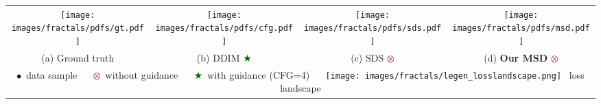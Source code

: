 \newcommand{\datasample}{\textcolor{black}{$\bullet$}}
\newcommand{\withguidance}{\textcolor{darkgreen}{$\bigstar$}}
\newcommand{\noguidance}{\textcolor{darkred}{$\otimes$}}
\newcommand{\guidancelimitedinterval}{\textcolor{cyan}{$\blacklozenge$}}

\newcommand{\classone}{\textcolor{orange}{orange}}
\newcommand{\classtwo}{\textcolor{gray}{gray}}

\begin{figure*}[t]
    \centering
    \setlength{\tabcolsep}{1.5mm}
    \begin{tabular}{c c c c}
        \texttt{[image: images/fractals/pdfs/gt.pdf]}
        & 
        \texttt{[image: images/fractals/pdfs/cfg.pdf]}
        &
        \texttt{[image: images/fractals/pdfs/sds.pdf]}
        &
        \texttt{[image: images/fractals/pdfs/msd.pdf]}
        \\ 
        (a) Ground truth & (b) DDIM \withguidance & (c) SDS \noguidance & (d) \textbf{Our MSD} \noguidance
        \\[3mm]
        \multicolumn{4}{c}{\datasample {\small \, data sample} $\quad$ \noguidance {\small \, without guidance} $\quad$ \withguidance {\small \, with guidance (CFG=4)} $\quad$ \texttt{[image: images/fractals/legen\_losslandscape.png]} {\small \, loss landscape}}
    \end{tabular}
    \vspace{-2mm}
    \caption{
        Mode-seeking simulated in a fractal-like 2D distribution with two (\classone, \classtwo) classes, adapted from \citet{karras2024guiding}. We compare the behavior of diffusion sampling (DDIM) to optimization-based diffusion distillation, in a class-conditional setting. With class=\classone, \textbf{(a)} Ground truth distribution, \textbf{(b)} DDIM sampling, \textbf{(c)} SDS optimization without guidance, and \textbf{(d)} our MSD optimization without guidance.
    }
    \label{fig:fractal_2D_part1}
\end{figure*}
